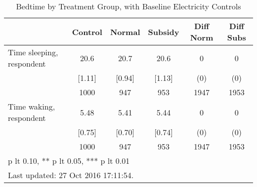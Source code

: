 \begin{table}[htbp]\centering
\def\sym#1{\ifmmode^{#1}\else\(^{#1}\)\fi}
\caption{Bedtime by Treatment Group, with Baseline Electricity Controls \label{tab:"balance"}}
\begin{tabular*}{0.9\hsize}{@{\hskip\tabcolsep\extracolsep\fill}l*{1}{ccccc}}
\toprule
                                &  Control&   Normal&  Subsidy&Diff Norm         &Diff Subs         \\
\midrule
Time sleeping, respondent       &     20.6&     20.7&     20.6&        0         &        0         \\
                                &   [1.11]&   [0.94]&   [1.13]&      (0)         &      (0)         \\
                                &     1000&      947&      953&     1947         &     1953         \\
Time waking, respondent         &     5.48&     5.41&     5.44&        0         &        0         \\
                                &   [0.75]&   [0.70]&   [0.74]&      (0)         &      (0)         \\
                                &     1000&      947&      953&     1947         &     1953         \\
\bottomrule
\multicolumn{6}{l}{\footnotesize * p lt 0.10, ** p lt 0.05, *** p lt 0.01}\\
\multicolumn{6}{l}{\footnotesize Last updated: 27 Oct 2016 17:11:54.}\\
\end{tabular*}
\end{table}
